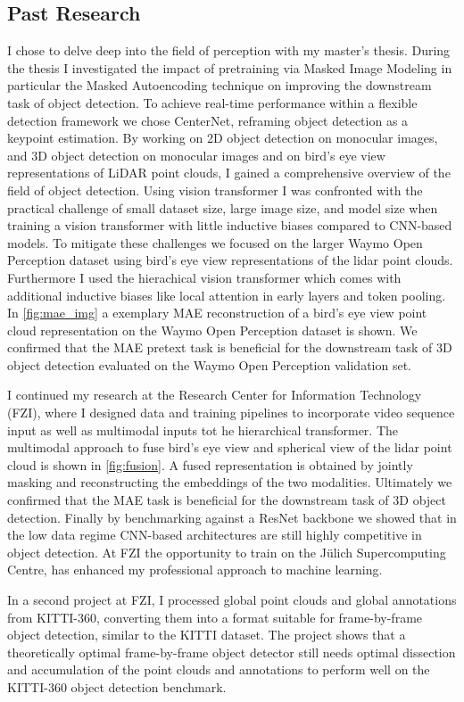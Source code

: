 


 \subsection{\textbf{Past Research}}
 I chose to delve deep into the field of perception with my master's thesis. During the thesis I investigated the impact of pretraining via Masked Image Modeling in particular the Masked Autoencoding \cite{mae} technique on improving the downstream task of object detection. To achieve real-time performance within a flexible detection framework we chose CenterNet, reframing object detection as a keypoint estimation. By working on 2D object detection on monocular images, and 3D object detection on monocular images and on bird's eye view representations of LiDAR point clouds, I gained a comprehensive overview of the field of object detection. 
 Using vision transformer I was confronted with the practical challenge of small dataset size, large image size, and model size when training a vision transformer with little inductive biases compared to CNN-based models. To mitigate these challenges we focused on the larger Waymo Open Perception dataset using bird's eye view representations of the lidar point clouds. Furthermore I used the hierachical vision transformer which comes with additional inductive biases like local attention in early layers and token pooling. In \autoref{fig:mae_img} a exemplary MAE reconstruction of a bird's eye view point cloud representation on the Waymo Open Perception dataset is shown. We confirmed that the MAE pretext task is beneficial for the downstream task of 3D object detection evaluated on the Waymo Open Perception validation set.

 I continued my research at the Research Center for Information Technology (FZI), where I designed data and training pipelines to incorporate video sequence input as well as multimodal inputs tot he hierarchical transformer. The multimodal approach to fuse bird's eye view and spherical view of the lidar point cloud is shown in \autoref{fig:fusion}. A fused representation is obtained by jointly masking and reconstructing the embeddings of the two modalities. Ultimately we confirmed that the MAE task is beneficial for the downstream task of 3D object detection. Finally by benchmarking against a ResNet backbone we showed that in the low data regime CNN-based architectures are still highly competitive in object detection. At FZI the opportunity to train on the Jülich Supercomputing Centre, has enhanced my professional approach to machine learning.

 In a second project at FZI, I processed global point clouds and global annotations from KITTI-360, converting them into a format suitable for frame-by-frame object detection, similar to the KITTI dataset. The project shows that a theoretically optimal frame-by-frame object detector still needs optimal dissection and accumulation of the point clouds and annotations to perform well on the KITTI-360 object detection benchmark.
 





